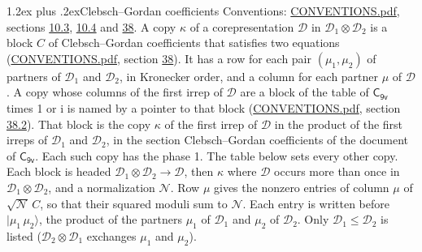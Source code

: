 \documentclass[10pt,a4paper]{article}
\makeatletter
\renewcommand\section{\@startsection{section}{1}{\z@}{-3ex plus -1ex minus -.2ex}%
  {1.2ex plus .2ex}{\normalfont\large\sffamily\bfseries\color{parttitle}}}
\numberwithin{equation}{section}
\newcommand{\grp}[1]{\mathsf{#1}}
\newcommand{\iunit}{\mathrm{i}}
\newcommand{\irrprod}{\otimes}
\newcommand{\mult}{\kappa}
\newcommand{\intx}{\mu}
\newcommand{\cgnorm}{\mathcal{N}}
\newcommand{\prodket}[2]{\lvert {#1}\,{#2}\rangle}
\makeatother
\begin{document}
\section{Clebsch--Gordan coefficients}\label{s:clebsch_gordan}
Conventions: \href{../../CONVENTIONS.pdf}{CONVENTIONS.pdf}, sections \href{../../../rotation/CONVENTIONS.pdf\#conv.10.3}{10.3}, \href{../../../rotation/CONVENTIONS.pdf\#conv.10.4}{10.4} and \href{../../CONVENTIONS.pdf\#conv.38}{38}.
\leavevmode\label{n:index.copy}\label{n:matrix.cg.stored}A copy $\mult$ of a corepresentation $\mathcal{D}$ in $\mathcal{D}_1\irrprod\mathcal{D}_2$ is a block $C$ of Clebsch--Gordan coefficients that satisfies two equations (\href{../../CONVENTIONS.pdf}{CONVENTIONS.pdf}, section \href{../../CONVENTIONS.pdf\#conv.38}{38}). \label{n:index.cg}It has a row for each pair $(\intx_1, \intx_2)$ of partners of $\mathcal{D}_1$ and $\mathcal{D}_2$, in Kronecker order, and a column for each partner $\intx$ of $\mathcal{D}$.
A copy whose columns of the first irrep of $\mathcal{D}$ are a block of the table of $\grp{C_{9v}}$ times 1 or $\iunit$ is named by a pointer to that block (\href{../../CONVENTIONS.pdf}{CONVENTIONS.pdf}, section \href{../../CONVENTIONS.pdf\#conv.38.2}{38.2}). That block is the copy $\mult$ of the first irrep of $\mathcal{D}$ in the product of the first irreps of $\mathcal{D}_1$ and $\mathcal{D}_2$, in the section Clebsch--Gordan coefficients of the document of \href{../../../rotation/data/pdf/C9v.pdf}{$\grp{C_{9v}}$}. Each such copy has the phase 1. The table below sets every other copy.
Each block is headed $\mathcal{D}_1\irrprod\mathcal{D}_2\to\mathcal{D}$, then $\mult$ where $\mathcal{D}$ occurs more than once in $\mathcal{D}_1\irrprod\mathcal{D}_2$, and a normalization $\cgnorm$. Row $\intx$ gives the nonzero entries of column $\intx$ of $\sqrt{\cgnorm}\,C$, so that their squared moduli sum to $\cgnorm$. \label{n:vector.ket.product}Each entry is written before $\prodket{\intx_1}{\intx_2}$, the product of the partners $\intx_1$ of $\mathcal{D}_1$ and $\intx_2$ of $\mathcal{D}_2$. Only $\mathcal{D}_1 \le \mathcal{D}_2$ is listed ($\mathcal{D}_2\irrprod\mathcal{D}_1$ exchanges $\intx_1$ and $\intx_2$).
\end{document}
